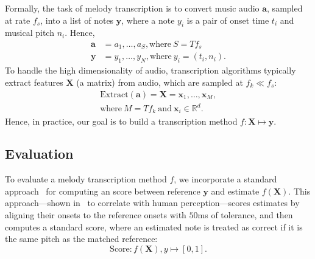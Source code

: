 Formally, the task of melody transcription is to convert music audio $\bm{a}$, sampled at rate $f_s$, into a list of notes $\bm{y}$, where a note $y_i$ is a pair of onset time $t_i$ and musical pitch $n_i$. Hence, 
\begin{align*}
    \bm{a} &= a_1, \ldots, a_S, \text{where}~S = Tf_s \\
    \bm{y} &= y_1, \ldots, y_N, \text{where}~y_i = (t_i, n_i).
\end{align*}
To handle the high dimensionality of audio, transcription algorithms typically extract features $\bm{X}$ (a matrix) from audio, which are sampled at $f_k \ll f_s$:
\begin{align*}
    \text{Extract}(\bm{a}) = \bm{X} = \bm{x}_1, \ldots, \bm{x}_M, \\ 
    \text{where}~M = Tf_k~\text{and}~\bm{x}_i \in \mathbb{R}^d.
\end{align*}
Hence, in practice, our goal is to build a transcription method 
$f : \bm{X} \mapsto \bm{y}$.

\subsection{Evaluation}
\label{sec:eval}


To evaluate a melody transcription method $f$, 
we incorporate a standard approach~\cite{raffel2014eval} for computing an \fone{} score between reference $\bm{y}$ and estimate $f(\bm{X})$. 
This approach---shown in~\cite{ycart2020investigating} to correlate with human perception---scores estimates by aligning their onsets to the reference onsets with $50$ms of tolerance, and then computes a standard \fone{} score, where an estimated note is treated as correct if it is the same pitch as the matched reference:
\begin{equation*}
    \text{Score} : f(\bm{X}), y \mapsto [0, 1].
\end{equation*}

